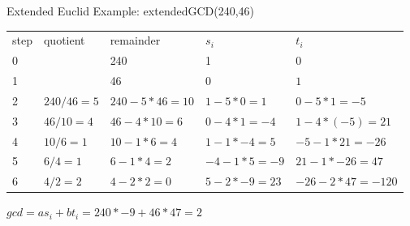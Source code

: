\begin{withoutheadline}
\begin{frame}[fragile]{Extended Euclid}
    Example: extendedGCD(240,46)
\begin{tabular}{p{0.8cm}|p{2cm}|p{2cm}|p{2cm}|p{2cm}} %
step & quotient       & remainder            & $s_i$            & $t_i$             \\     
0    &                & 240                  & 1                & $0$               \\ 
1    &                & 46                  & $0$               & $1$               \\   
2    & $240 / 46 = 5$ & $240 - 5 * 46 = 10$ & $1 - 5*0 = 1$     & $0 - 5*1 = -5$    \\ 
3    & $46 / 10 = 4$  & $46 - 4 * 10 = 6$   & $0 - 4*1 = -4$    & $1 - 4*(-5) = 21$ \\
4    & $10 / 6 = 1$   & $10 - 1 * 6 = 4$    & $1 - 1*-4 = 5$    & $-5 - 1*21 = -26$ \\
5    & $6 / 4 = 1$    & $6 - 1 * 4 = 2$     & $-4 -1*5 = -9$    & $21 - 1*-26 = 47$ \\
6    & $4 / 2 = 2$    & $4 - 2 * 2 = 0$     & $5 - 2*-9 = 23$ & $-26 - 2*47 = -120$ \\
\end{tabular}
$gcd = a s_i + b t_i = 240*-9 + 46*47 = 2$
\end{frame}



\end{withoutheadline}
